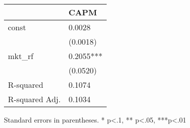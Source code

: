 \begin{table}
\caption{}
\label{}
\begin{center}
\begin{tabular}{ll}
\hline
               & CAPM       \\
\hline
const          & 0.0028     \\
               & (0.0018)   \\
mkt\_rf        & 0.2055***  \\
               & (0.0520)   \\
R-squared      & 0.1074     \\
R-squared Adj. & 0.1034     \\
\hline
\end{tabular}
\end{center}
\end{table}
\bigskip
Standard errors in parentheses. \newline 
* p<.1, ** p<.05, ***p<.01